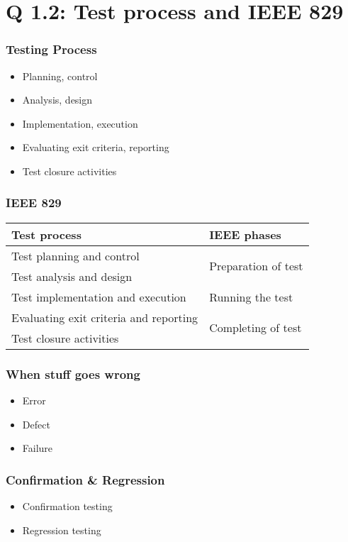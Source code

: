 

\section{Q 1.2: Test process and IEEE 829}
\begin{frame}
    \frametitle{Testing Process}
    \begin{itemize}
        \item Planning, control
        \item Analysis, design
        \item Implementation, execution
        \item Evaluating exit criteria, reporting
        \item Test closure activities
    \end{itemize}
\end{frame}

\begin{frame}
    \frametitle{IEEE 829}
    \begin{tabular}{ | l | l | }
        \hline
        \textbf{Test process} & \textbf{IEEE phases} \\ \hline
        Test planning and control & \multirow{2}{*}{Preparation of test} \\
            \cline{1-1}
        Test analysis and design & \\ \hline
        Test implementation and execution & Running the test \\ \hline
        Evaluating exit criteria and reporting & \multirow{2}{*}{Completing of
            test} \\ \cline{1-1}
        Test closure activities & \\ \hline
    \end{tabular}
\end{frame}

\begin{frame}
    \frametitle{When stuff goes wrong}
    \begin{itemize}
        \item Error %
        \item Defect %
        \item Failure %
    \end{itemize}
\end{frame}

\begin{frame}
    \frametitle{Confirmation \& Regression}
    \begin{itemize}
        \item Confirmation testing
        \item Regression testing
    \end{itemize}
\end{frame}


